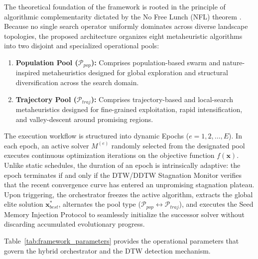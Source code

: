 The theoretical foundation of the framework is rooted in the principle of algorithmic complementarity dictated by the No Free Lunch (NFL) theorem \cite{wolpert1997no}. Because no single search operator uniformly dominates across diverse landscape topologies, the proposed architecture organizes eight metaheuristic algorithms into two disjoint and specialized operational pools:
\begin{enumerate}
    \item \textbf{Population Pool ($\mathcal{P}_{pop}$):} Comprises population-based swarm and nature-inspired metaheuristics designed for global exploration and structural diversification across the search domain.
    \item \textbf{Trajectory Pool ($\mathcal{P}_{traj}$):} Comprises trajectory-based and local-search metaheuristics designed for fine-grained exploitation, rapid intensification, and valley-descent around promising regions.
\end{enumerate}

The execution workflow is structured into dynamic Epochs ($e = 1, 2, \dots, E$). In each epoch, an active solver $M^{(e)}$ randomly selected from the designated pool executes continuous optimization iterations on the objective function $f(\mathbf{x})$. Unlike static schedules, the duration of an epoch is intrinsically adaptive: the epoch terminates if and only if the DTW/DDTW Stagnation Monitor verifies that the recent convergence curve has entered an unpromising stagnation plateau. Upon triggering, the orchestrator freezes the active algorithm, extracts the global elite solution $\mathbf{x}_{best}^*$, alternates the pool type ($\mathcal{P}_{pop} \leftrightarrow \mathcal{P}_{traj}$), and executes the Seed Memory Injection Protocol to seamlessly initialize the successor solver without discarding accumulated evolutionary progress.

Table~\ref{tab:framework_parameters} provides the operational parameters that govern the hybrid orchestrator and the DTW detection mechanism.

